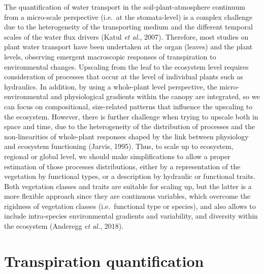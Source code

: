 \documentclass[11pt,twoside]{reedthesis}
\begin{document}
The quantification of water transport in the soil-plant-atmosphere
continuum from a micro-scale perspective (i.e.~at the stomata-level) is
a complex challenge due to the heterogeneity of the transporting medium
and the different temporal scales of the water flux drivers (Katul
\emph{et al.}, 2007). Therefore, most studies on plant water transport
have been undertaken at the organ (leaves) and the plant levels,
observing emergent macroscopic responses of transpiration to
environmental changes. Upscaling from the leaf to the ecosystem level
requires consideration of processes that occur at the level of
individual plants such as hydraulics. In addition, by using a
whole-plant level perspective, the micro-environmental and physiological
gradients within the canopy are integrated, so we can focus on
compositional, size-related patterns that influence the upscaling to the
ecosystem. However, there is further challenge when trying to upscale
both in space and time, due to the heterogeneity of the distribution of
processes and the non-linearities of whole-plant responses shaped by the
link between physiology and ecosystem functioning (Jarvis, 1995). Thus,
to scale up to ecosystem, regional or global level, we should make
simplifications to allow a proper estimation of those processes
distributions, either by a representation of the vegetation by
functional types, or a description by hydraulic or functional traits.
Both vegetation classes and traits are suitable for scaling up, but the
latter is a more flexible approach since they are continuous variables,
which overcome the rigidness of vegetation classes (i.e.~functional type
or species), and also allows to include intra-species environmental
gradients and variability, and diversity within the ecosystem (Anderegg
\emph{et al.}, 2018).\par

\section{Transpiration
quantification}\label{transpiration-quantification}
\end{document}

